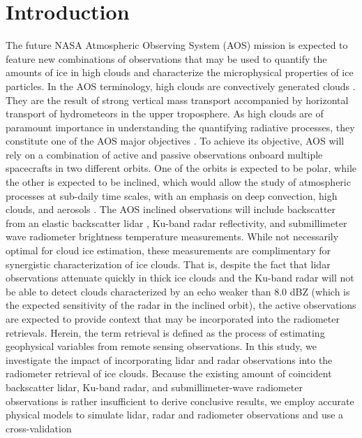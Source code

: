 \documentclass{ametsocV6.1}
\begin{document}
\section{Introduction}
The future NASA Atmospheric Observing System (AOS) mission \citep{braun2022} is expected to feature new 
combinations of observations that may be used to quantify the amounts of ice in high clouds and 
characterize the microphysical properties of ice particles. In the AOS terminology, high clouds are convectively
generated clouds \citep{braun2022}. They are the result of strong vertical mass transport accompanied by
horizontal transport of hydrometeors in the upper troposphere.  As high clouds are of paramount importance in
understanding the quantifying radiative processes, they constitute one of the AOS major objectives \citep{braun2022}.
To achieve its objective, AOS will rely on a combination of active and passive observations onboard multiple spacecrafts
in two different orbits.  One of the orbits is expected to be polar, while the other is expected to be inclined, which
would allow the study of atmospheric processes at sub-daily time scales, with an emphasis on deep
convection, high clouds, and aerosols \citep{braun2022,yorks2022}.
The AOS inclined observations will include backscatter
from an elastic backscatter lidar \citep{weitkamp2006},
Ku-band radar reflectivity, and submillimeter wave radiometer brightness temperature measurements. 
While not necessarily optimal for cloud ice estimation, these measurements are 
complimentary for synergistic characterization of ice clouds. 
That is, despite the fact that lidar observations 
attenuate quickly in thick ice clouds and the Ku-band radar will not be able to detect clouds 
characterized by an echo weaker than 8.0 dBZ (which is the expected sensitivity of the radar in the inclined
orbit), the active observations are expected to provide context 
that may be incorporated into the radiometer retrievals. Herein, the term retrieval is defined as the 
process of estimating geophysical variables from remote sensing observations.
In this study, we investigate the impact of 
incorporating lidar and radar observations into the radiometer retrieval of ice clouds.
Because the existing amount of coincident backscatter lidar, Ku-band radar, and submillimeter-wave 
radiometer observations is rather insufficient to derive conclusive results, we employ accurate 
physical models to simulate lidar, radar and radiometer observations and use a cross-validation 
\end{document}
